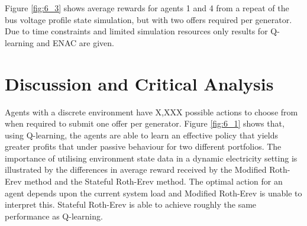 
Figure \ref{fig:6_3} shows average rewards for agents 1 and 4 from a repeat of
the bus voltage profile state simulation, but with two offers required per
generator.  Due to time constraints and limited simulation resources only
results for Q-learning and ENAC are given.

\section{Discussion and Critical Analysis}
\label{sec:discuss}
Agents with a discrete environment have X,XXX possible actions to choose from
when required to submit one offer per generator.  Figure \ref{fig:6_1} shows
that, using Q-learning, the agents are able to learn an effective policy that
yields greater profits that under passive behaviour for two different
portfolios.  The importance of utilising environment state data in a dynamic
electricity setting is illustrated by the differences in average reward received
by the Modified Roth-Erev method and the Stateful Roth-Erev method.  The optimal
action for an agent depends upon the current system load and Modified Roth-Erev
is unable to interpret this.  Stateful Roth-Erev is able to achieve roughly the
same performance as Q-learning.

